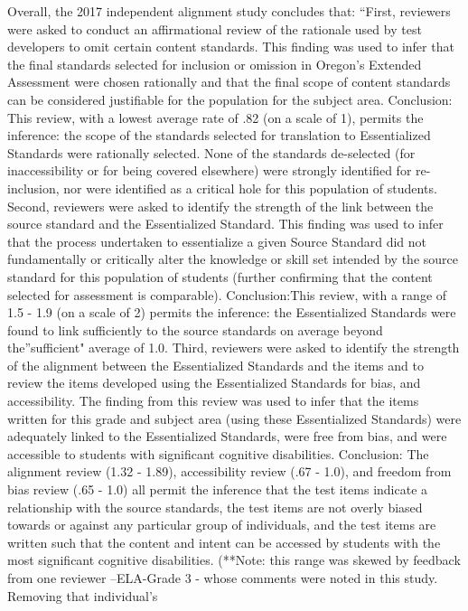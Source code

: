 \documentclass[]{article}
\begin{document}
Overall, the 2017 independent alignment study concludes that: ``First,
reviewers were asked to conduct an affirmational review of the rationale
used by test developers to omit certain content standards. This finding
was used to infer that the final standards selected for inclusion or
omission in Oregon's Extended Assessment were chosen rationally and that
the final scope of content standards can be considered justifiable for
the population for the subject area. Conclusion: This review, with a
lowest average rate of .82 (on a scale of 1), permits the inference: the
scope of the standards selected for translation to Essentialized
Standards were rationally selected. None of the standards de-selected
(for inaccessibility or for being covered elsewhere) were strongly
identified for re- inclusion, nor were identified as a critical hole for
this population of students. Second, reviewers were asked to identify
the strength of the link between the source standard and the
Essentialized Standard. This finding was used to infer that the process
undertaken to essentialize a given Source Standard did not fundamentally
or critically alter the knowledge or skill set intended by the source
standard for this population of students (further confirming that the
content selected for assessment is comparable). Conclusion:This review,
with a range of 1.5 - 1.9 (on a scale of 2) permits the inference: the
Essentialized Standards were found to link sufficiently to the source
standards on average beyond the''sufficient" average of 1.0. Third,
reviewers were asked to identify the strength of the alignment between
the Essentialized Standards and the items and to review the items
developed using the Essentialized Standards for bias, and accessibility.
The finding from this review was used to infer that the items written
for this grade and subject area (using these Essentialized Standards)
were adequately linked to the Essentialized Standards, were free from
bias, and were accessible to students with significant cognitive
disabilities. Conclusion: The alignment review (1.32 - 1.89),
accessibility review (.67 - 1.0), and freedom from bias review (.65 -
1.0) all permit the inference that the test items indicate a
relationship with the source standards, the test items are not overly
biased towards or against any particular group of individuals, and the
test items are written such that the content and intent can be accessed
by students with the most significant cognitive disabilities. (**Note:
this range was skewed by feedback from one reviewer --ELA-Grade 3 -
whose comments were noted in this study. Removing that individual's
\end{document}
